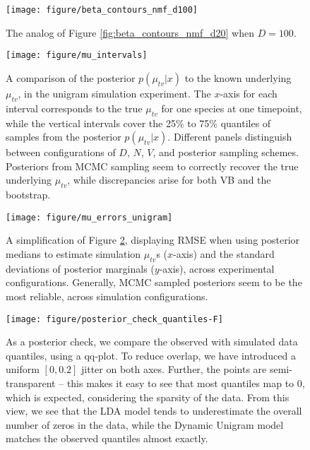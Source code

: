 \documentclass[oupdraft]{bio}
\begin{document}
\begin{figure}[!p]
  \centering
  \texttt{[image: figure/beta\_contours\_nmf\_d100]}
  \caption{The analog of Figure \ref{fig:beta_contours_nmf_d20} when $D = 100$.
  \label{fig:beta_contours_nmf_d100}}
\end{figure}

\begin{figure}[ht]
  \centering
  \texttt{[image: figure/mu\_intervals]}
  \caption{
    A comparison of the posterior $p\left(\mu_{tv} \vert x\right)$ to the known
    underlying $\mu_{tv}$, in the unigram simulation experiment. The $x$-axis
    for each interval corresponds to the true $\mu_{tv}$ for one species at one
    timepoint, while the vertical intervals cover the 25\% to 75\% quantiles of
    samples from the posterior $p\left(\mu_{tv} \vert x\right)$. Different
    panels distinguish between configurations of $D$, $N$, $V$, and posterior
    sampling schemes. Posteriors from MCMC sampling seem to correctly recover
    the true underlying $\mu_{tv}$, while discrepancies arise for both VB and
    the bootstrap.
    \label{fig:mu_intervals} }
\end{figure}

\begin{figure}[ht]
  \centering
  \texttt{[image: figure/mu\_errors\_unigram]}
  \caption{A simplification of Figure \ref{fig:mu_intervals}, displaying RMSE when
    using posterior medians to estimate simulation $\mu_{tv}$s ($x$-axis) and
    the standard deviations of posterior marginals ($y$-axis), across
    experimental configurations. Generally, MCMC sampled posteriors seem to be
    the most reliable, across simulation configurations.
    \label{fig:mu_errors_unigram}
  }
\end{figure}

\begin{figure}[!p]
  \centering
  \texttt{[image: figure/posterior\_check\_quantiles-F]}
  \caption{As a posterior check, we compare the observed with simulated
    data quantiles, using a qq-plot. To reduce overlap, we have introduced a
    uniform $\left[0, 0.2\right]$ jitter on both axes. Further, the points are
    semi-transparent -- this makes it easy to see that most quantiles map to 0,
    which is expected, considering the sparsity of the data. From this view, we
    see that the LDA model tends to underestimate the overall number of zeros in
    the data, while the Dynamic Unigram model matches the observed quantiles
    almost exactly. \label{fig:antibiotics_posterior_quantiles} }
\end{figure}
\end{document}

